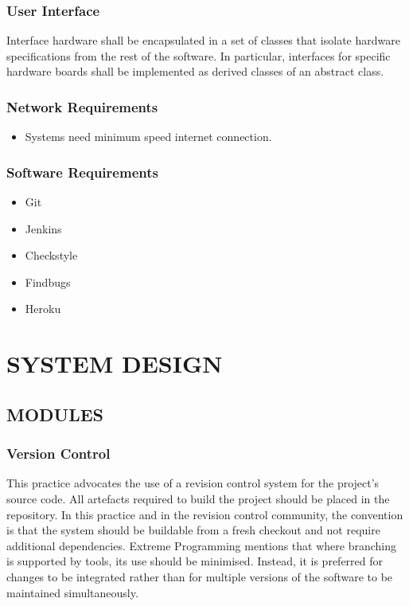 \documentclass[12pt,a4paper,oneside]{report}
\begin{document}
{\subsection{User Interface}
Interface hardware shall be encapsulated in a set of classes that isolate hardware specifications from the rest of the software. In particular, interfaces for specific hardware boards shall be implemented as derived classes of an abstract class.
\\

\subsection{Network Requirements}  
\begin{itemize}
\item Systems need minimum speed internet connection.
\end{itemize}
\subsection{Software Requirements}
\begin{itemize}
\item Git
\item Jenkins
\item Checkstyle
\item Findbugs
\item Heroku
\end{itemize}
\chapter{SYSTEM DESIGN}
\section{MODULES}
\subsection{Version Control}

\par This practice advocates the use of a revision control system for the project's source code. All artefacts required to build the project should be placed in the repository. In this practice and in the revision control community, the convention is that the system should be buildable from a fresh checkout and not require additional dependencies.  Extreme Programming  mentions that where branching is supported by tools, its use should be minimised. Instead, it is preferred for changes to be integrated rather than for multiple versions of the software to be maintained simultaneously. 
}
\end{document}
